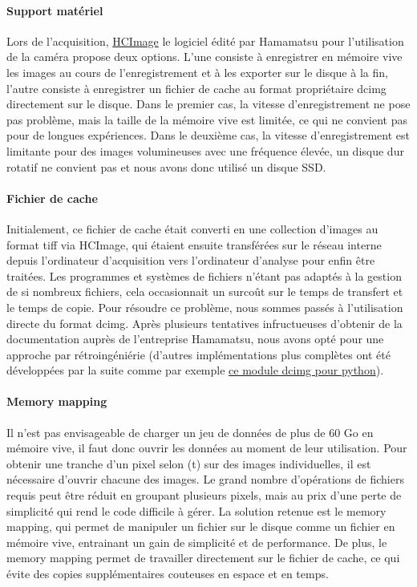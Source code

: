 \paragraph{Support matériel}
Lors de l'acquisition, \href{https://hcimage.com/}{HCImage} le logiciel édité par Hamamatsu pour l'utilisation de la caméra propose deux options. L'une consiste à enregistrer en mémoire vive les images au cours de l'enregistrement et à les exporter sur le disque à la fin, l'autre consiste à enregistrer un fichier de cache au format propriétaire dcimg directement sur le disque. Dans le premier cas, la vitesse d'enregistrement ne pose pas problème, mais la taille de la mémoire vive est limitée, ce qui ne convient pas pour de longues expériences. Dans le deuxième cas, la vitesse d'enregistrement est limitante pour des images volumineuses avec une fréquence élevée, un disque dur rotatif ne convient pas et nous avons donc utilisé un disque SSD.

\paragraph{Fichier de cache}
Initialement, ce fichier de cache était converti en une collection d'images au format tiff via HCImage, qui étaient ensuite transférées sur le réseau interne depuis l'ordinateur d'acquisition vers l'ordinateur d'analyse pour enfin être traitées. Les programmes et systèmes de fichiers n'étant pas adaptés à la gestion de si nombreux fichiers, cela occasionnait un surcoût sur le temps de transfert et le temps de copie. Pour résoudre ce problème, nous sommes passés à l'utilisation directe du format dcimg. Après plusieurs tentatives infructueuses d'obtenir de la documentation auprès de l'entreprise Hamamatsu, nous avons opté pour une approche par rétroingéniérie (d'autres implémentations plus complètes ont été développées par la suite comme par exemple \href{https://github.com/lens-biophotonics/dcimg}{ce module dcimg pour python}).

\paragraph{Memory mapping}
Il n'est pas envisageable de charger un jeu de données de plus de 60 Go en mémoire vive, il faut donc ouvrir les données au moment de leur utilisation. Pour obtenir une tranche d'un pixel selon (t) sur des images individuelles, il est nécessaire d'ouvrir chacune des images. Le grand nombre d'opérations de fichiers requis peut être réduit en groupant plusieurs pixels, mais au prix d'une perte de simplicité qui rend le code difficile à gérer. La solution retenue est le memory mapping, qui permet de manipuler un fichier sur le disque comme un fichier en mémoire vive, entrainant un gain de simplicité et de performance. De plus, le memory mapping permet de travailler directement sur le fichier de cache, ce qui évite des copies supplémentaires couteuses en espace et en temps.


